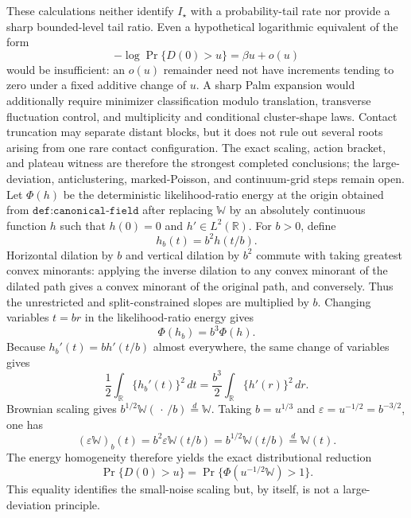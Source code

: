 These calculations neither identify \(I_\star\) with a probability-tail rate nor provide a sharp bounded-level tail ratio.  Even a hypothetical logarithmic equivalent of the form
\[
 -\log\Pr\{D(0)>u\}=\beta u+o(u)
\]
would be insufficient: an \(o(u)\) remainder need not have increments tending to zero under a fixed additive change of \(u\).  A sharp Palm expansion would additionally require minimizer classification modulo translation, transverse fluctuation control, and multiplicity and conditional cluster-shape laws.  Contact truncation may separate distant blocks, but it does not rule out several roots arising from one rare contact configuration.  The exact scaling, action bracket, and plateau witness are therefore the strongest completed conclusions; the large-deviation, anticlustering, marked-Poisson, and continuum-grid steps remain open.
Let \(\Phi(h)\) be the deterministic likelihood-ratio energy at the origin obtained from \(\texttt{def:canonical-field}\) after replacing \(\mathbb W\) by an absolutely continuous function \(h\) such that \(h(0)=0\) and \(h'\in L^2(\mathbb R)\).  For \(b>0\), define
\[
 h_b(t)=b^2h(t/b).
\]
Horizontal dilation by \(b\) and vertical dilation by \(b^2\) commute with taking greatest convex minorants: applying the inverse dilation to any convex minorant of the dilated path gives a convex minorant of the original path, and conversely.  Thus the unrestricted and split-constrained slopes are multiplied by \(b\).  Changing variables \(t=br\) in the likelihood-ratio energy gives
\[
 \Phi(h_b)=b^3\Phi(h).
\]
Because \(h_b'(t)=b h'(t/b)\) almost everywhere, the same change of variables gives
\[
 \frac12\int_{\mathbb R}\{h_b'(t)\}^2\,dt
 =\frac{b^3}{2}\int_{\mathbb R}\{h'(r)\}^2\,dr.
\]
Brownian scaling gives \(b^{1/2}\mathbb W(\,\cdot\,/b)\stackrel{d}=\mathbb W\).  Taking \(b=u^{1/3}\) and \(\varepsilon=u^{-1/2}=b^{-3/2}\), one has
\[
 (\varepsilon\mathbb W)_b(t)=b^2\varepsilon\mathbb W(t/b)
 =b^{1/2}\mathbb W(t/b)\stackrel{d}=\mathbb W(t).
\]
The energy homogeneity therefore yields the exact distributional reduction
\[
 \Pr\{D(0)>u\}
 =\Pr\{\Phi(u^{-1/2}\mathbb W)>1\}.
\]
This equality identifies the small-noise scaling but, by itself, is not a large-deviation principle.

